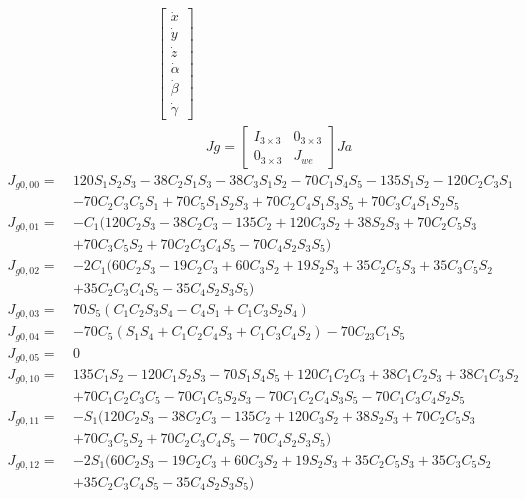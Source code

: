 \documentclass[12pt]{article}
\begin{document}
\begin{CJK}{UTF8}{bsmi}
\begin{equation*}
\begin{split}
\begin{bmatrix}
\dot{x} \\
\dot{y} \\
\dot{z} \\
\dot{\alpha} \\ 
\dot{\beta} \\ 
\dot{\gamma} 
\end{bmatrix}\\
&Jg = 							
\begin{bmatrix}
I_{3\times 3} & 0_{3\times 3}\\
0_{3\times 3} & J_{we}
\end{bmatrix}
Ja
\end{split}
\end{equation*}
\begin{equation*}
\begin{split}
J_{g0,00} =\  &120S_1S_2S_3 - 38C_2S_1S_3 - 38C_3S_1S_2 - 70C_1S_4S_5 - 135S_1S_2 - 120C_2C_3S_1\\
         	  &- 70C_2C_3C_5S_1 + 70C_5S_1S_2S_3  + 70C_2C_4S_1S_3S_5 + 70C_3C_4S_1S_2S_5\\
J_{g0,01} =\  &-C_1(120C_2S_3 - 38C_2C_3 - 135C_2 + 120C_3S_2 + 38S_2S_3 + 70C_2C_5S_3 \\
         	  &+ 70C_3C_5S_2 + 70C_2C_3C_4S_5 - 70C_4S_2S_3S_5)\\
J_{g0,02} =\  &-2C_1(60C_2S_3 - 19C_2C_3 + 60C_3S_2 + 19S_2S_3 + 35C_2C_5S_3 + 35C_3C_5S_2\\ 
         	  &+ 35C_2C_3C_4S_5 - 35C_4S_2S_3S_5)\\
J_{g0,03} =\  &70S_5(C_1C_2S_3S_4 - C_4S_1 + C_1C_3S_2S_4)\\
J_{g0,04} =\  &- 70C_5(S_1S_4 + C_1C_2C_4S_3 + C_1C_3C_4S_2) - 70C_{23}C_1S_5\\
J_{g0,05} =\  &0\\
J_{g0,10} =\  &135C_1S_2 - 120C_1S_2S_3 - 70S_1S_4S_5 + 120C_1C_2C_3 + 38C_1C_2S_3 + 38C_1C_3S_2 \\
		 	  &+ 70C_1C_2C_3C_5 - 70C_1C_5S_2S_3 - 70C_1C_2C_4S_3S_5 - 70C_1C_3C_4S_2S_5\\
J_{g0,11} =\  &-S_1(120C_2S_3 - 38C_2C_3 - 135C_2 + 120C_3S_2 + 38S_2S_3 + 70C_2C_5S_3\\
		   	  &+ 70C_3C_5S_2 + 70C_2C_3C_4S_5 - 70C_4S_2S_3S_5)\\
J_{g0,12} =\  &-2S_1(60C_2S_3 - 19C_2C_3 + 60C_3S_2 + 19S_2S_3 + 35C_2C_5S_3 + 35C_3C_5S_2 \\ 
		 	  &+ 35C_2C_3C_4S_5 - 35C_4S_2S_3S_5)\\

\end{split}
\end{equation*}
\end{CJK}
\end{document}
